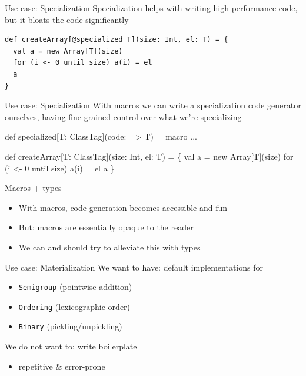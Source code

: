 \documentclass{beamer}
\begin{document}
\begin{frame}[fragile]{Use case: Specialization}
  Specialization helps with writing high-performance code,
  but it bloats the code significantly

  \vspace{1em}
  \begin{verbatim}
def createArray[@specialized T](size: Int, el: T) = {
  val a = new Array[T](size)
  for (i <- 0 until size) a(i) = el
  a
}
  \end{verbatim}
\end{frame}

\begin{frame}[fragile]{Use case: Specialization}
  With macros we can write a specialization code generator ourselves,
  having fine-grained control over what we're specializing

  \vspace{1em}
  \begin{semiverbatim}
def specialized[T: ClassTag](code: => T) = macro ...

def createArray[T: ClassTag](size: Int, el: T) = \{
  val a = new Array[T](size)
    for (i <- 0 until size) a(i) = el
  \text{\color{blue}{\}}}
  a
\}
  \end{semiverbatim}
\end{frame}

\begin{frame}{Macros + types}
  \begin{itemize}
    \item With macros, code generation becomes accessible and fun
    \item But: macros are essentially opaque to the reader
    \item We can and should try to alleviate this with types
  \end{itemize}
\end{frame}

\begin{frame}{Use case: Materialization}
  We want to have: default implementations for
  \begin{itemize}
    \item \texttt{Semigroup} (pointwise addition)
    \item \texttt{Ordering} (lexicographic order)
    \item \texttt{Binary} (pickling/unpickling)
  \end{itemize}

  \vspace{1em}
  We do not want to: write boilerplate
  \begin{itemize}
    \item repetitive \& error-prone
  \end{itemize}
\end{frame}
\end{document}
